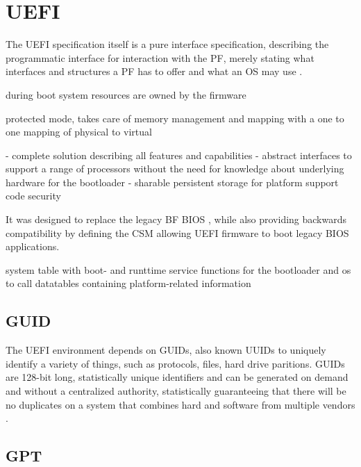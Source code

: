 
\section{\acf{UEFI}}

The \ac{UEFI} specification itself is a pure interface specification, describing the programmatic interface for interaction with the \ac{PF}, merely stating what interfaces and structures a \ac{PF} has to offer and what an \ac{OS} may use \cite{beyond-bios}.

during boot system resources are owned by the firmware

protected mode, takes care of memory management and mapping with a one to one mapping of physical to virtual


- complete solution describing all features and capabilities
- abstract interfaces to support a range of processors without the need for knowledge about underlying hardware for the bootloader
- sharable persistent storage for platform support code
security

It was designed to replace the legacy \acl{BF} \ac{BIOS} , while also providing backwards compatibility by defining the \acf{CSM} allowing \ac{UEFI} firmware to boot legacy \ac{BIOS} applications.

system table with boot- and runttime service functions for the bootloader and os to call
datatables containing platform-related information

\cite{beyond-bios}

\subsection{\acf{GUID}}

The \ac{UEFI} environment depends on \acp{GUID}, also known \acp{UUID} to uniquely identify a variety of things, such as protocols, files, hard drive paritions.
\acp{GUID} are 128-bit long, statistically unique identifiers and can be generated on demand and without a centralized authority, statistically guaranteeing that there will be no duplicates on a system that combines hard and software from multiple vendors \cite{rfc-4122}.

\subsection{\acf{GPT}}

